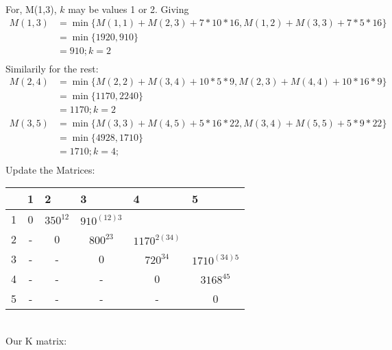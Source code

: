 \documentclass[12pt]{article}
\begin{document}
For, M(1,3), $k$ may be values 1 or 2.
Giving
\begin{align*}
M(1,3) & =\min \{ M(1,1) + M(2,3) + 7 * 10* 16, M(1,2) + M(3,3) + 7*5*16 \} \\
            &= \min \{1920, 910\}\\
           &= 910; k =2\\
\end{align*}
Similarily for the rest:
\begin{align*}
M(2,4) & = \min \{ M(2,2) +  M(3,4) + 10*5*9, M(2,3) + M(4,4) +10*16*9 \} \\
            & = \min \{ 1170, 2240\}\\
            & = 1170; k=2\\
M(3,5) & = \min \{M(3,3) + M(4,5) + 5*16*22, M(3,4) + M(5,5)+ 5*9*22\} \\
            &= \min \{ 4928, 1710 \} \\
           & = 1710; k=4;\\
\end{align*}
Update the Matrices:
\begin{table}[h]
\centering
\begin{tabular}{|c|c|c|c|c|c|}
\hline
\multicolumn{1}{|l|}{} & \multicolumn{1}{|l|}{1} & \multicolumn{1}{l|}{2} & \multicolumn{1}{l|}{3} & \multicolumn{1}{l|}{4} & \multicolumn{1}{l|}{5} \\ \hline
1&0                       & $350^{12}$                     &  $910^{ (12)3}$                    &                       &                   \\ \hline
2&-                       & 0                     & $800^{23} $                     &   $1170^{2(34)}$                    &                   \\ \hline
3&-                       & -                     & 0                     & $ 720^{34} $                    &  $1710^{(34)5}$                     \\ \hline
4&-                       & -                     & -                     & 0                     & $ 3168^{45}$                     \\ \hline
5&-                       & -                     & -                     & -                     &    0                   \\ \hline
\end{tabular}
\end{table}
\\
Our K matrix:\\
\end{document}
